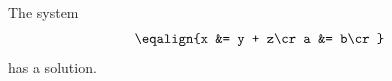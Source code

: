 %
\hsize=6.5in
\vsize=8.9in
\nopagenumbers
\noindent
The system $$\eqalign{x &= y + z\cr a &= b\cr}$$ has a solution.
\par
\bye

